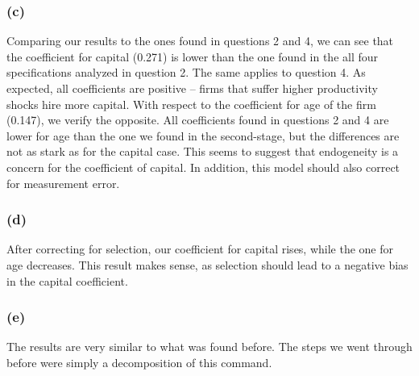 \documentclass[11pt]{article}
\begin{document}
\subsubsection*{(c)}

\FloatBarrier
Comparing our results to the ones found in questions 2 and 4, we can see that the coefficient for capital (0.271) is lower than the one found in the all four specifications analyzed in question 2. The same applies to question 4. As expected, all coefficients are positive -- firms that suffer higher productivity shocks hire more capital. 
With respect to the coefficient for age of the firm (0.147), we verify the opposite. All coefficients found in questions 2 and 4 are lower for age than the one we found in the second-stage, but the differences are not as stark as for the capital case. 
This seems to suggest that endogeneity is a concern for the coefficient of capital. In addition, this model should also correct for measurement error.  
\newpage
\subsubsection*{(d)}

\FloatBarrier
After correcting for selection, our coefficient for capital rises, while the one for age decreases. 
This result makes sense, as selection should lead to a negative bias in the capital coefficient. 

\subsubsection*{(e)}

\FloatBarrier

The results are very similar to what was found before. The steps we went through before were simply a decomposition of this command.  
\end{document}
